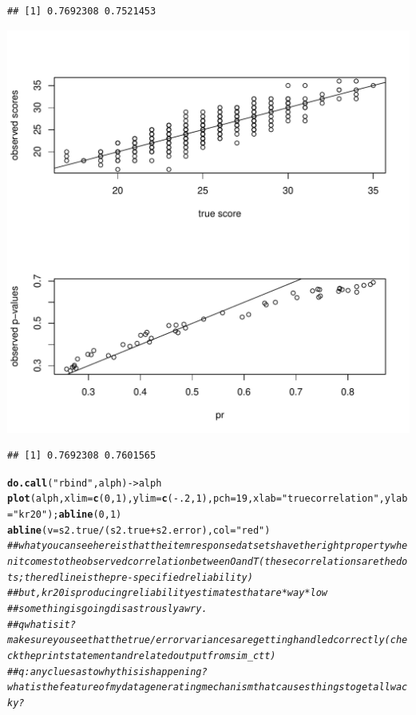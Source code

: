 \documentclass{article}\usepackage[]{graphicx}\usepackage[]{color}
\makeatletter
\def\maxwidth{ %
  \ifdim\Gin@nat@width>\linewidth
    \linewidth
  \else
    \Gin@nat@width
  \fi
}
\newcommand{\hlnum}[1]{\textcolor[rgb]{0.686,0.059,0.569}{#1}}%
\newcommand{\hlstr}[1]{\textcolor[rgb]{0.192,0.494,0.8}{#1}}%
\newcommand{\hlcom}[1]{\textcolor[rgb]{0.678,0.584,0.686}{\textit{#1}}}%
\newcommand{\hlopt}[1]{\textcolor[rgb]{0,0,0}{#1}}%
\newcommand{\hlstd}[1]{\textcolor[rgb]{0.345,0.345,0.345}{#1}}%
\newcommand{\hlkwb}[1]{\textcolor[rgb]{0.69,0.353,0.396}{#1}}%
\newcommand{\hlkwc}[1]{\textcolor[rgb]{0.333,0.667,0.333}{#1}}%
\newcommand{\hlkwd}[1]{\textcolor[rgb]{0.737,0.353,0.396}{\textbf{#1}}}%
\newenvironment{kframe}{%
 \def\at@end@of@kframe{}%
 \ifinner\ifhmode%
  \def\at@end@of@kframe{\end{minipage}}%
  \begin{minipage}{\columnwidth}%
 \fi\fi%
 \def\FrameCommand##1{\hskip\@totalleftmargin \hskip-\fboxsep
 \colorbox{shadecolor}{##1}\hskip-\fboxsep
     \hskip-\linewidth \hskip-\@totalleftmargin \hskip\columnwidth}%
 \MakeFramed {\advance\hsize-\width
   \@totalleftmargin\z@ \linewidth\hsize
   \@setminipage}}%
 {\par\unskip\endMakeFramed%
 \at@end@of@kframe}
\newenvironment{knitrout}{}{} %
\makeatother
\begin{document}
\begin{knitrout}
\begin{kframe}\begin{verbatim}
## [1] 0.7692308 0.7521453
\end{verbatim}
\end{kframe}
\includegraphics[width=\maxwidth]{figure/unnamed-chunk-2-10} 
\begin{kframe}\begin{verbatim}
## [1] 0.7692308 0.7601565
\end{verbatim}
\begin{alltt}
\hlkwd{do.call}\hlstd{(}\hlstr{"rbind"}\hlstd{,alph)}\hlkwb{->}\hlstd{alph}
\hlkwd{plot}\hlstd{(alph,}\hlkwc{xlim}\hlstd{=}\hlkwd{c}\hlstd{(}\hlnum{0}\hlstd{,}\hlnum{1}\hlstd{),}\hlkwc{ylim}\hlstd{=}\hlkwd{c}\hlstd{(}\hlopt{-}\hlnum{.2}\hlstd{,}\hlnum{1}\hlstd{),}\hlkwc{pch}\hlstd{=}\hlnum{19}\hlstd{,}\hlkwc{xlab}\hlstd{=}\hlstr{"true correlation"}\hlstd{,}\hlkwc{ylab}\hlstd{=}\hlstr{"kr20"}\hlstd{);} \hlkwd{abline}\hlstd{(}\hlnum{0}\hlstd{,}\hlnum{1}\hlstd{)}
\hlkwd{abline}\hlstd{(}\hlkwc{v}\hlstd{=s2.true}\hlopt{/}\hlstd{(s2.true}\hlopt{+}\hlstd{s2.error),}\hlkwc{col}\hlstd{=}\hlstr{"red"}\hlstd{)}
\hlcom{##what you can see here is that the item response datsets have the right property when it comes to the observed correlation between O and T (these correlations are the dots; the red line is the pre-specified reliability)}
\hlcom{##but, kr20 is producing reliability estimates that are *way* low}
\hlcom{##something is going disastrously awry.}
\hlcom{##q what is it? make sure you see that the true/error variances are getting handled correctly (check the print statement and related output from sim_ctt)}
\hlcom{##q: any clues as to why this is happening? what is the feature of my data generating mechanism that causes things to get all wacky?}


\end{alltt}
\end{kframe}
\end{knitrout}
\end{document}
